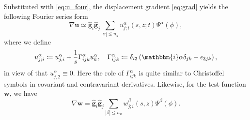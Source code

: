 \documentclass[extra,referee]{gji}
\begin{document}
Substituted with \eqref{eq:u_four}, the displacement gradient 
\eqref{eq:grad} yields the following Fourier series form
\begin{equation}
  \nabla\mathbf{u}\simeq\hat{\mathbf{g}}_{i}\hat{\mathbf{g}}_{j}
  \sum_{|\alpha|\le n_u}u_{j;i}^\alpha\left(s,z;t\right) \Psi^\alpha\left(\phi\right),
  \label{eq:grad_u}
\end{equation}
where we define 
\begin{equation}
  u_{j;i}^\alpha \coloneqq u_{j,i}^\alpha+
  \frac{1}{s}\Gamma_{ijk}^\alpha u_k^\alpha,\quad 
  \Gamma_{ijk}^\alpha \coloneqq  
  \delta_{i2}\left(\mathbbm{i}\alpha\delta_{jk}-\epsilon_{3jk}\right),
  \label{eq:gamma}
\end{equation}
in view of that $u_{j,2}^\alpha \equiv 0$.
Here the role of $\Gamma_{ijk}^{\alpha}$ is quite similar to Christoffel
symbols in covariant and contravariant derivatives. 
Likewise, for the test function $\mathbf{w}$, we have
\begin{equation}
  \nabla\mathbf{w}=\hat{\mathbf{g}}_{i}\hat{\mathbf{g}}_{j}
  \sum_{|\beta|\le n_u}w_{j;i}^\beta\left(s,z\right) \Psi^\beta\left(\phi\right).
  \label{eq:grad_w}
\end{equation}
\end{document}
